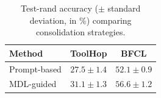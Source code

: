 \begin{table}[t]
\small
\caption{Test-rand accuracy ($\pm$ standard deviation, in \%) comparing consolidation strategies.}
\vspace{0.5em}
\label{tab:consolid}
\centering
\renewcommand{\arraystretch}{1.25}
\begin{tabular}{@{}lcc@{}}
\toprule
\textbf{Method} & \textbf{ToolHop} & \textbf{BFCL} \\
\midrule
Prompt-based 
& $27.5 \scriptstyle \pm 1.4$
& $52.1 \scriptstyle \pm 0.9$ \\
MDL-guided 
& $\mathbf{31.1} \scriptstyle \pm 1.3$ 
& $\mathbf{56.6} \scriptstyle \pm 1.2$ \\
\bottomrule
\end{tabular}
\end{table}
